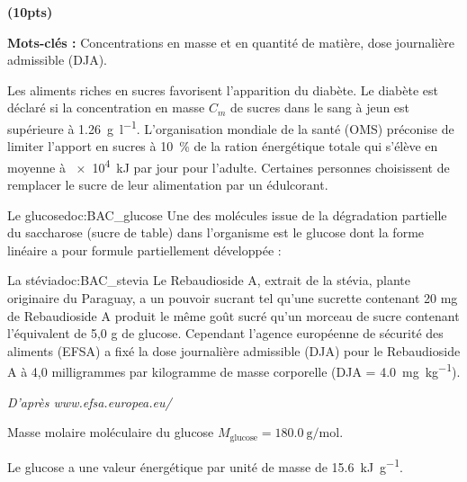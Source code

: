  \textbf{(10pts)}

\textbf{Mots-clés :} Concentrations en masse et en quantité de matière, dose journalière
admissible (DJA).
\medskip

Les aliments riches en sucres favorisent l'apparition du diabète. Le diabète est déclaré si la
concentration en masse $C_m$ de sucres dans le sang à jeun est supérieure à \qty{1,26}{\g\per\litre}.
L'organisation mondiale de la santé (OMS) préconise de limiter l'apport en sucres à \qty{10}{\percent} de la ration énergétique totale qui s'élève en moyenne à \qty{e4}{\kilo\joule} par jour pour l'adulte.
Certaines personnes choisissent de remplacer le sucre de leur alimentation par un édulcorant.

\begin{doc}{Le glucose}{doc:BAC_glucose}
  Une des molécules issue de la dégradation partielle du saccharose (sucre de table)
  dans l'organisme est le glucose dont la forme linéaire a pour formule partiellement développée :
  \begin{center}
  \end{center}
\end{doc}

\begin{doc}{La stévia}{doc:BAC_stevia}
  Le Rebaudioside A, extrait de la stévia, plante originaire du Paraguay, a un pouvoir sucrant tel
  qu'une sucrette contenant 20 mg de Rebaudioside A produit le même goût sucré qu'un morceau
  de sucre contenant l'équivalent de 5,0 g de glucose.
  Cependant l'agence européenne de sécurité des aliments (EFSA)
  a fixé la dose journalière admissible (DJA)
  pour le Rebaudioside A à 4,0 milligrammes par kilogramme de masse corporelle
  (DJA = \qty{4,0}{\milli\g\per\kg}).

  \begin{flushright}
    \textit{D'après www.efsa.europea.eu/}
  \end{flushright}
\end{doc}

\begin{donnees}
  \item Masse molaire moléculaire du glucose $M_\text{glucose} = \qty{180,0}{\g\per\mol}$.
  \item Le glucose a une valeur énergétique par unité de masse de \qty{15,6}{\kilo\joule\per\g}.
\end{donnees}

